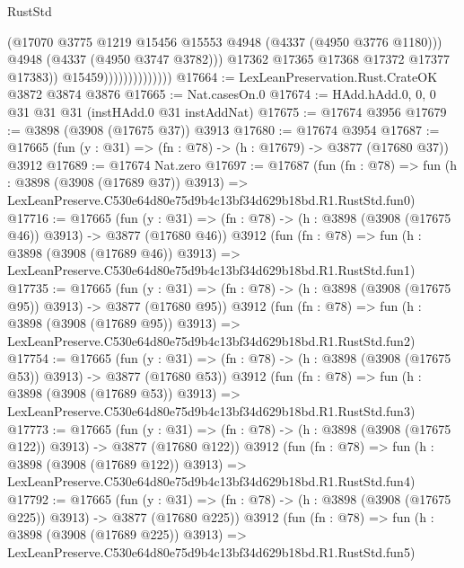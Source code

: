 \begin{lexlean}{RustStd}
\begin{coremodule}
                                      (@17070
                                        @3775
                                        @1219
                                        @15456
                                        @15553
                                        @4948
                                        (@4337 (@4950 @3776 @1180)))
                                      @4948
                                      (@4337 (@4950 @3747 @3782)))
                                    @17362
                                    @17365
                                    @17368
                                    @17372
                                    @17377
                                    @17383))
                                @15459))))))))))))))
@17664 := LexLeanPreservation.Rust.CrateOK @3872 @3874 @3876
@17665 := Nat.casesOn.{0}
@17674 := HAdd.hAdd.{0, 0, 0} @31 @31 @31 (instHAdd.{0} @31 instAddNat)
@17675 := @17674 @3956
@17679 := @3898 (@3908 (@17675 @37)) @3913
@17680 := @17674 @3954
@17687 := @17665 (fun (y : @31) => (fn : @78) -> (h : @17679) -> @3877 (@17680 @37)) @3912
@17689 := @17674 Nat.zero
@17697 := @17687
    (fun (fn : @78) =>
    fun (h : @3898 (@3908 (@17689 @37)) @3913) =>
    LexLeanPreserve.C530e64d80e75d9b4c13bf34d629b18bd.R1.RustStd.fun0)
@17716 := @17665
    (fun (y : @31) => (fn : @78) -> (h : @3898 (@3908 (@17675 @46)) @3913) -> @3877 (@17680 @46))
    @3912
    (fun (fn : @78) =>
    fun (h : @3898 (@3908 (@17689 @46)) @3913) =>
    LexLeanPreserve.C530e64d80e75d9b4c13bf34d629b18bd.R1.RustStd.fun1)
@17735 := @17665
    (fun (y : @31) => (fn : @78) -> (h : @3898 (@3908 (@17675 @95)) @3913) -> @3877 (@17680 @95))
    @3912
    (fun (fn : @78) =>
    fun (h : @3898 (@3908 (@17689 @95)) @3913) =>
    LexLeanPreserve.C530e64d80e75d9b4c13bf34d629b18bd.R1.RustStd.fun2)
@17754 := @17665
    (fun (y : @31) => (fn : @78) -> (h : @3898 (@3908 (@17675 @53)) @3913) -> @3877 (@17680 @53))
    @3912
    (fun (fn : @78) =>
    fun (h : @3898 (@3908 (@17689 @53)) @3913) =>
    LexLeanPreserve.C530e64d80e75d9b4c13bf34d629b18bd.R1.RustStd.fun3)
@17773 := @17665
    (fun (y : @31) => (fn : @78) -> (h : @3898 (@3908 (@17675 @122)) @3913) -> @3877 (@17680 @122))
    @3912
    (fun (fn : @78) =>
    fun (h : @3898 (@3908 (@17689 @122)) @3913) =>
    LexLeanPreserve.C530e64d80e75d9b4c13bf34d629b18bd.R1.RustStd.fun4)
@17792 := @17665
    (fun (y : @31) => (fn : @78) -> (h : @3898 (@3908 (@17675 @225)) @3913) -> @3877 (@17680 @225))
    @3912
    (fun (fn : @78) =>
    fun (h : @3898 (@3908 (@17689 @225)) @3913) =>
    LexLeanPreserve.C530e64d80e75d9b4c13bf34d629b18bd.R1.RustStd.fun5)

\end{coremodule}
\end{lexlean}
